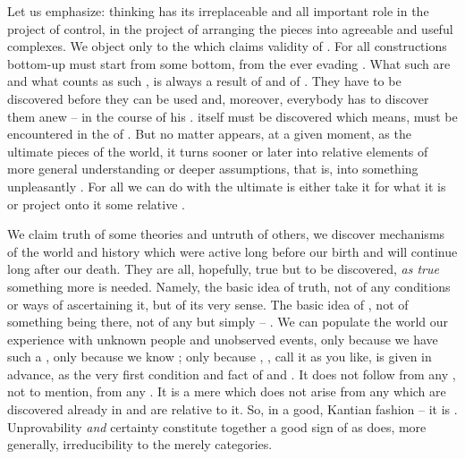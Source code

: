 \pa Let us emphasize:  thinking has its irreplaceable and all
important role in the project of control, in the project of 
arranging the  pieces into agreeable and useful complexes. We
object only to the  which claims 
validity of . For all constructions bottom-up must start from
some  bottom, from the ever evading . What such
 are and what counts as such , is always a result of
 and  of . They have
to be discovered before they can be used and, moreover, everybody has to
discover them anew -- in the course of his .  
itself must be discovered which means, must be encountered in the
 of .  But no matter  appears, at a
given moment, as the ultimate pieces of the  world, it turns
sooner or later into relative elements of more general understanding or deeper
assumptions, that is, into something unpleasantly . For all we
can do with the ultimate  is either take it for what it is or project
onto it some relative . 

We claim truth of some theories and untruth of others, we discover mechanisms of
the world and history which were active long before our birth and will continue
long after our death.  They are all, hopefully, true but to be discovered,
 {\em as true} something more is needed. Namely, the basic idea
of truth, not of any conditions or ways of ascertaining it, but of its very
sense. The basic idea of , not of something being there, not of
any  but simply -- . We can populate the world 
our experience with unknown people and unobserved events, only because we have
such a , only because we know ; only because ,
, call it as you like, is given in advance, as the very first
condition and fact of
 and . %
It does not follow from any , not to mention, from any
. It is a mere  which does not arise from any
 which are discovered already in  and are relative to
it.  So, in a good, Kantian fashion -- it is .  Unprovability {\em
  and} certainty constitute together a good sign of  as does, more
generally, irreducibility to the merely  categories.

